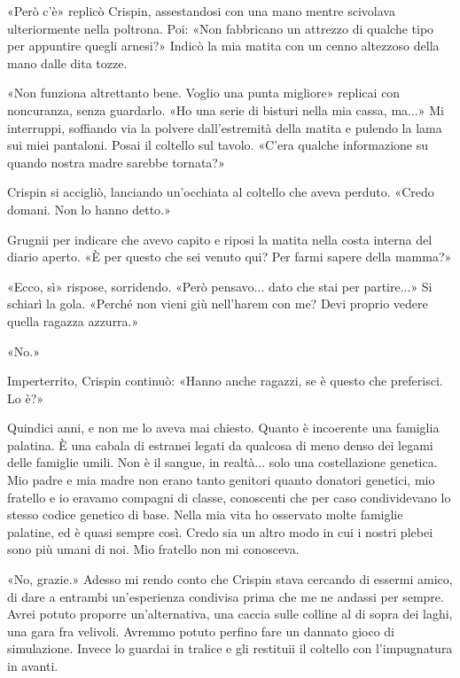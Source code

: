 «Però c'è» replicò Crispin, assestandosi con una mano mentre scivolava
ulteriormente nella poltrona. Poi: «Non fabbricano un attrezzo di
qualche tipo per appuntire quegli arnesi?» Indicò la mia matita con un
cenno altezzoso della mano dalle dita tozze.

«Non funziona altrettanto bene. Voglio una punta migliore» replicai con
noncuranza, senza guardarlo. «Ho una serie di bisturi nella mia cassa,
ma...» Mi interruppi, soffiando via la polvere dall'estremità della
matita e pulendo la lama sui miei pantaloni. Posai il coltello sul
tavolo. «C'era qualche informazione su quando nostra madre sarebbe
tornata?»

Crispin si accigliò, lanciando un'occhiata al coltello che aveva
perduto. «Credo domani. Non lo hanno detto.»

Grugnii per indicare che avevo capito e riposi la matita nella costa
interna del diario aperto. «È per questo che sei venuto qui? Per farmi
sapere della mamma?»

«Ecco, sì» rispose, sorridendo. «Però pensavo... dato che stai per
partire...» Si schiarì la gola. «Perché non vieni giù nell'harem con me?
Devi proprio vedere quella ragazza azzurra.»

«No.»

Imperterrito, Crispin continuò: «Hanno anche ragazzi, se è questo che
preferisci. Lo è?»

Quindici anni, e non me lo aveva mai chiesto. Quanto è incoerente una
famiglia palatina. È una cabala di estranei legati da qualcosa di meno
denso dei legami delle famiglie umili. Non è il sangue, in realtà...
solo una costellazione genetica. Mio padre e mia madre non erano tanto
genitori quanto donatori genetici, mio fratello e io eravamo compagni di
classe, conoscenti che per caso condividevano lo stesso codice genetico
di base. Nella mia vita ho osservato molte famiglie palatine, ed è quasi
sempre così. Credo sia un altro modo in cui i nostri plebei sono più
umani di noi. Mio fratello non mi conosceva.

«No, grazie.» Adesso mi rendo conto che Crispin stava cercando di
essermi amico, di dare a entrambi un'esperienza condivisa prima che me
ne andassi per sempre. Avrei potuto proporre un'alternativa, una caccia
sulle colline al di sopra dei laghi, una gara fra velivoli. Avremmo
potuto perfino fare un dannato gioco di simulazione. Invece lo guardai
in tralice e gli restituii il coltello con l'impugnatura in avanti.

\begin{figure}
	\centering
	\def\svgwidth{\columnwidth}
	\scalebox{0.2}{}
\end{figure}

